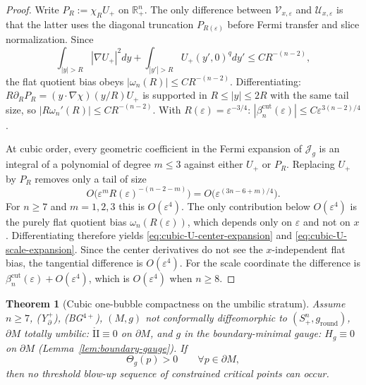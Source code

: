 \documentclass[11pt,reqno,a4paper]{amsart}
\numberwithin{equation}{section}
\theoremstyle{plain}
\newtheorem{theorem}{Theorem}[section]
\theoremstyle{remark}
\theoremstyle{plain}
\begin{document}
\begin{proof}
Write $P_R:=\chi_RU_+$ on $\mathbb R^n_+$.
The only difference between $\mathcal V_{x,\varepsilon}$ and $\mathcal U_{x,\varepsilon}$
is that the latter uses the diagonal truncation $P_{R(\varepsilon)}$ before Fermi transfer
and slice normalization.
Since
\[
\int_{|y|>R}|\nabla U_+|^2dy
+\int_{|y'|>R}U_+(y',0)^qdy'
\le CR^{-(n-2)},
\]
the flat quotient bias obeys $|\omega_n(R)|\le CR^{-(n-2)}$.
Differentiating: $R\partial_RP_R=(y\cdot\nabla\chi)(y/R)U_+$ is supported in $R\le|y|\le2R$
with the same tail size, so $|R\omega_n'(R)|\le CR^{-(n-2)}$.
With $R(\varepsilon)=\varepsilon^{-3/4}$:
$|\beta_n^{\mathrm{cut}}(\varepsilon)|\le C\varepsilon^{3(n-2)/4}$.

At cubic order, every geometric coefficient in the Fermi expansion of
$\mathcal J_g$ is an integral of a polynomial of degree $m\le3$ against either $U_+$ or $P_R$.
Replacing $U_+$ by $P_R$ removes only a tail of size
\[
O\big(\varepsilon^mR(\varepsilon)^{-(n-2-m)}\big)
=O\big(\varepsilon^{(3n-6+m)/4}\big).
\]
For $n\ge7$ and $m=1,2,3$ this is $O(\varepsilon^4)$.
The only contribution below $O(\varepsilon^4)$ is the purely flat quotient bias
$\omega_n(R(\varepsilon))$, which depends only on $\varepsilon$ and not on $x$.
Differentiating therefore yields \eqref{eq:cubic-U-center-expansion} and
\eqref{eq:cubic-U-scale-expansion}.
Since the center derivatives do not see the $x$-independent flat bias,
the tangential difference is $O(\varepsilon^4)$.
For the scale coordinate the difference is $\beta_n^{\mathrm{cut}}(\varepsilon)+O(\varepsilon^4)$,
which is $O(\varepsilon^4)$ when $n\ge8$.
\end{proof}

\begin{theorem}[Cubic one-bubble compactness on the umbilic stratum]
\label{thm:compactness-umbilic}
Assume $n\ge7$, \textup{(Y$^+_{\partial}$)}, \textup{(BG$^{4+}$)},
$(M,g)$ not conformally diffeomorphic to $(S^n_+,g_{\mathrm{round}})$,
$\partial M$ totally umbilic: $\mathring{\mathrm{II}}\equiv0$ on $\partial M$,
and $g$ in the boundary-minimal gauge: $H_g\equiv0$ on $\partial M$
(Lemma~\ref{lem:boundary-gauge}).
If
\[
\Theta_g(p)>0
\qquad\forall p\in \partial M,
\]
then no threshold blow-up sequence of constrained critical points can occur.
\end{theorem}
\end{document}
